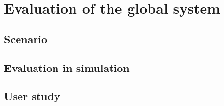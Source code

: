 \documentclass[english,a4paper,11pt,twoside]{StyleThese}
\begin{document}
\setcounter{chapter}{5} %
\dominitoc
\faketableofcontents
\fi

\chapter{Evaluation of the global system}
\minitoc

\label{ch:Eval}

\section{Scenario}

\section{Evaluation in simulation}

\section{User study}


\ifdefined{}
\else


\end{document}

